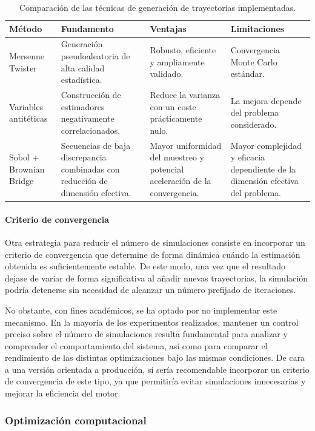 \documentclass[11pt]{article}
\begin{document}
\begin{table}[H]
\centering
\begin{tabular}{p{3cm}p{3.5cm}p{4cm}p{4cm}}
\toprule
Método & Fundamento & Ventajas & Limitaciones \\
\midrule
Mersenne Twister &
Generación pseudoaleatoria de alta calidad estadística. &
Robusto, eficiente y ampliamente validado. &
Convergencia Monte Carlo estándar. \\
\addlinespace
Variables antitéticas &
Construcción de estimadores negativamente correlacionados. &
Reduce la varianza con un coste prácticamente nulo. &
La mejora depende del problema considerado. \\
\addlinespace
Sobol + Brownian Bridge &
Secuencias de baja discrepancia combinadas con reducción de dimensión efectiva. &
Mayor uniformidad del muestreo y potencial aceleración de la convergencia. &
Mayor complejidad y eficacia dependiente de la dimensión efectiva del problema. \\
\bottomrule
\end{tabular}
\caption{Comparación de las técnicas de generación de trayectorias implementadas.}
\label{tab:rng_comparison}
\end{table}

\paragraph{Criterio de convergencia}

Otra estrategia para reducir el número de simulaciones consiste en incorporar un criterio de convergencia que determine de forma dinámica cuándo la estimación obtenida es suficientemente estable. De este modo, una vez que el resultado dejase de variar de forma significativa al añadir nuevas trayectorias, la simulación podría detenerse sin necesidad de alcanzar un número prefijado de iteraciones.

No obstante, con fines académicos, se ha optado por no implementar este mecanismo. En la mayoría de los experimentos realizados, mantener un control preciso sobre el número de simulaciones resulta fundamental para analizar y comprender el comportamiento del sistema, así como para comparar el rendimiento de las distintas optimizaciones bajo las mismas condiciones. De cara a una versión orientada a producción, sí sería recomendable incorporar un criterio de convergencia de este tipo, ya que permitiría evitar simulaciones innecesarias y mejorar la eficiencia del motor.

\subsubsection{Optimización computacional}
\end{document}
